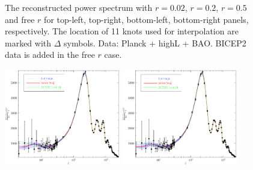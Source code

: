 \documentclass[11pt]{article}
\def \halffigwidth{0.45\textwidth}
\begin{document}
\begin{figure}
  \caption{The reconstructed power spectrum with $r = 0.02$, $r=0.2$, $r=0.5$ and free $r$ for top-left, top-right, bottom-left, bottom-right panels, respectively. The location of 11 knots used for interpolation are marked with $\Delta$ symbols. Data: Planck + highL + BAO. BICEP2 data is added in the free $r$ case. \label{fig:traj_power}}
\end{figure}

\begin{figure}
\includegraphics[width = \halffigwidth]{nobicep_spline0_p11_r0d02_clTT_trajs.pdf}%
\includegraphics[width = \halffigwidth]{nobicep_spline0_p11_r0d2_clTT_trajs.pdf}

\end{figure}
\end{document}
